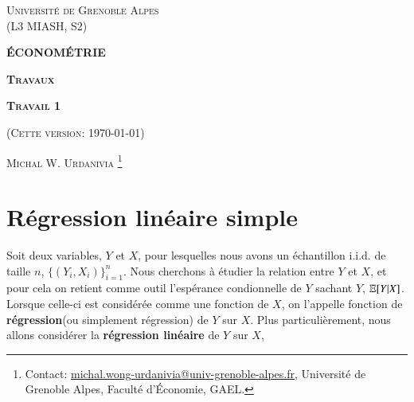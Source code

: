 \documentclass[10pt, reqno]{amsart}
\begin{document}
 
\usetikzlibrary{positioning}
\usetikzlibrary{snakes}
\usetikzlibrary{calc}
\usetikzlibrary{arrows}
\usetikzlibrary{decorations.markings}
\usetikzlibrary{shapes.misc}
\usetikzlibrary{shapes}

%

\begin{titlepage}
\centering
	{\scshape\Large \textsc{Université de Grenoble Alpes\\(L3 MIASH, S2)}\par}
	\vspace{0.5cm}
	{\Large\bfseries \scshape\Large \textsc{ÉCONOMÉTRIE}\par}
	\vspace{0.5cm}
	{\Large\bfseries \textsc{Travaux} \par}
    \vspace{0.5cm}   
   {\Large\bfseries \textsc{Travail 1} \par}
	\vspace{1cm}
	{(\textsc{Cette version: \today})\par}
	\vspace{1cm}
	{\large \textsc{Michal W. Urdanivia}
	\footnote{Contact:  
	\href{mailto:michal.wong-urdanivia@univ-grenoble-alpes.fr}{michal.wong-urdanivia@univ-grenoble-alpes.fr}, 
	 Université de Grenoble Alpes,  Faculté d'\'Economie, GAEL.}\par}
	
\end{titlepage}


\newpage

\tableofcontents

\newpage


\section{Régression linéaire simple}

Soit deux variables, $Y$ et $X$, pour lesquelles nous avons un échantillon i.i.d. de taille $n$, $\{(Y_i, X_i)\}_{i=1}^n$. Nous cherchons à étudier la relation entre $Y$ et $X$, et pour cela on retient comme outil l'espérance condionnelle de $Y$ sachant $Y$, $\mathbb{E}[Y|X]$. Lorsque celle-ci est considérée comme une fonction de $X$, on l'appelle fonction de \textbf{régression}(ou simplement régression) de $Y$ sur $X$. Plus particulièrement, nous allons considérer la \textbf{régression linéaire} de $Y$ sur $X$,
\end{document}

